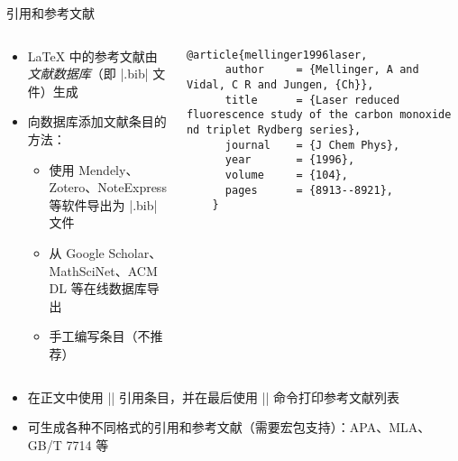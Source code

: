     \begin{frame}[fragile]{引用和参考文献}
      \begin{columns}
        \begin{column}{0.45\textwidth}
          \begin{itemize}
            \item \LaTeX{} 中的参考文献由\emph{文献数据库}（即 |.bib| 文件）生成
            \item 向数据库添加文献条目的方法：
              \begin{itemize}
                \item 使用 Mendely、Zotero、NoteExpress 等软件导出为 |.bib| 文件
                \item 从 Google Scholar、MathSciNet、ACM DL 等在线数据库导出
                \item 手工编写条目（不推荐）
              \end{itemize}
          \end{itemize}
        \end{column}
        \begin{column}{0.55\textwidth}
          \begin{lstlisting}[basicstyle=\footnotesize\ttfamily]
    @article{mellinger1996laser,
      author     = {Mellinger, A and Vidal, C R and Jungen, {Ch}},
      title      = {Laser reduced fluorescence study of the carbon monoxide nd triplet Rydberg series},
      journal    = {J Chem Phys},
      year       = {1996},
      volume     = {104},
      pages      = {8913--8921},
    }
            \end{lstlisting}
        \end{column}
      \end{columns}
      \begin{itemize}
        \item 在正文中使用 |\cite{key1, key2}| 引用条目，并在最后使用 || 命令打印参考文献列表
        \item \BibTeX{} 可生成各种不同格式的引用和参考文献（需要宏包支持）：APA、MLA、GB/T 7714 等
        \end{itemize}
    \end{frame}
    
